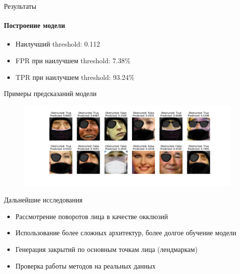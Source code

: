 \documentclass{beamer}
\begin{document}

\begin{frame}{Результаты}
\framesubtitle{Построение модели}
\begin{itemize}
    \item Наилучший threshold: 0.112
    \item FPR при наилучшем threshold: 7.38\%
    \item TPR при наилучшем threshold: 93.24\%
\end{itemize}
Примеры предсказаний модели
\begin{figure}[h!]
    \centering
    \includegraphics[scale=0.23]{preds_demo.pdf}
\end{figure}
\end{frame}


\begin{frame}{Дальнейшие исследования}
\begin{itemize}
    \item Рассмотрение поворотов лица в качестве окклюзий
    \item Использование более сложных архитектур, более долгое обучение модели
    \item Генерация закрытий по основным точкам лица (лендмаркам)
    \item Проверка работы методов на реальных данных
\end{itemize}
\end{frame}
\end{document}
